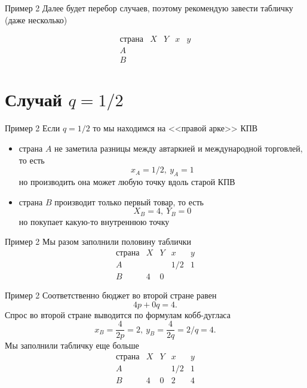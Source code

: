 \documentclass{beamer}
\begin{document}
\begin{frame}{Пример 2}
Далее будет перебор случаев, поэтому рекомендую завести табличку (даже несколько)

$$\begin{array}{c|c|c|c|c}
  \text{страна} & X & Y & x & y \\
  \hline
  A & & & &\\
  \hline
  B & & & &
\end{array}$$

\end{frame}

\section{Случай $q = 1/2$}

\begin{frame}{Пример 2}
Если $q = 1/2$ то мы находимся на <<правой арке>> КПВ
\begin{itemize}
  \item страна $A$ не заметила разницы между автаркией и международной торговлей, то есть $$x_A = 1/2, \ y_A = 1$$ но производить она может любую точку вдоль старой КПВ
  \item страна $B$ производит только первый товар, то есть
 $$X_B = 4, \ Y_B = 0$$
 но покупает какую-то внутреннюю точку
\end{itemize}
\end{frame}

\begin{frame}{Пример 2}
Мы разом заполнили половину таблички
$$\begin{array}{c|c|c|c|c}
  \text{страна} & X & Y & x & y \\
  \hline
  A & & & 1/2 & 1\\
  \hline
  B & 4 & 0 & &
\end{array}$$
\end{frame}

\begin{frame}{Пример 2}
Соответственно бюджет во второй стране равен $$4 p + 0 q = 4.$$ Спрос во второй стране выводится по формулам кобб-дугласа $$x_B = \frac{4}{2p} = 2, \ y_B = \frac{4}{2q} = 2/q = 4.$$
Мы заполнили табличку еще больше
$$\begin{array}{c|c|c|c|c}
  \text{страна} & X & Y & x & y \\
  \hline
  A & & & 1/2 & 1\\
  \hline
  B & 4 & 0 & 2 & 4
\end{array}$$
\end{frame}
\end{document}
